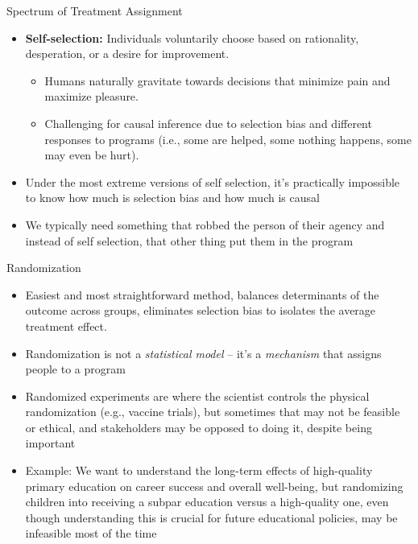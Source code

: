 \documentclass{beamer}
\begin{document}
\begin{frame}{Spectrum of Treatment Assignment}
\begin{itemize}
\item \textbf{Self-selection:} Individuals voluntarily choose based on rationality, desperation, or a desire for improvement.
\begin{itemize}
\item Humans naturally gravitate towards decisions that minimize pain and maximize pleasure.
\item Challenging for causal inference due to selection bias and different responses to programs (i.e., some are helped, some nothing happens, some may even be hurt).
\end{itemize}
\item Under the most extreme versions of self selection, it's practically impossible to know how much is selection bias and how much is causal
\item We typically need something that robbed the person of their agency and instead of self selection, that other thing put them in the program
\end{itemize}
\end{frame}


\begin{frame}{Randomization}
\begin{itemize}
\item Easiest and most straightforward method, balances determinants of the outcome across groups, eliminates selection bias to isolates the average treatment effect.
\item Randomization is not a \emph{statistical model} -- it's a \emph{mechanism} that assigns people to a program
\item Randomized experiments are where the scientist controls the physical randomization (e.g., vaccine trials), but sometimes that may not be feasible or ethical, and stakeholders may be opposed to doing it, despite being important
\item Example: We want to understand the long-term effects of high-quality primary education on career success and overall well-being, but randomizing children into receiving a subpar education versus a high-quality one, even though understanding this is crucial for future educational policies, may be infeasible most of the time
\end{itemize}
\end{frame}
\end{document}

